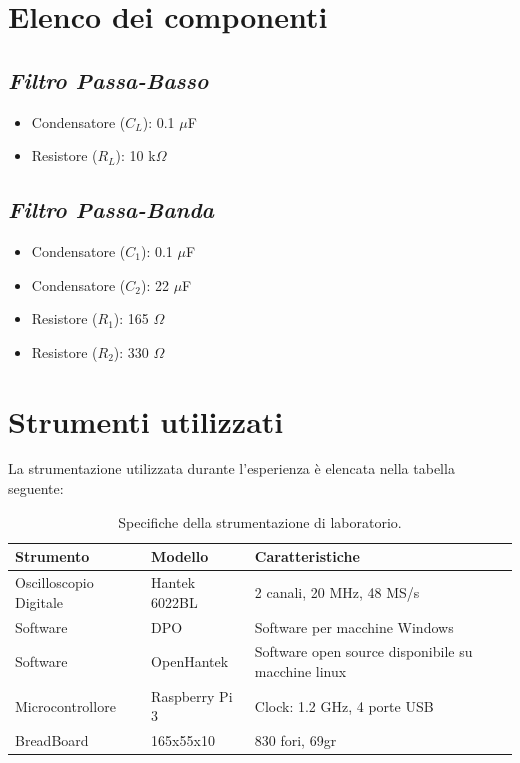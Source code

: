 \documentclass{article}
\begin{document}
\section{Elenco dei componenti}
  \subsection{\textit{Filtro Passa-Basso}}
    \begin{itemize}
        \item Condensatore ($C_{L}$): 0.1 $\mu$F
        \item Resistore ($R_{L}$): 10 k$\Omega$
    \end{itemize}

    \subsection{\textit{Filtro Passa-Banda}}
    \begin{itemize}
        \item Condensatore ($C_{1}$): 0.1 $\mu$F
        \item Condensatore ($C_{2}$): 22 $\mu$F
        \item Resistore ($R_{1}$): 165 $\Omega$
        \item Resistore ($R_{2}$): 330 $\Omega$
    \end{itemize}

\section{Strumenti utilizzati}

La strumentazione utilizzata durante l'esperienza è elencata nella tabella seguente:

  \begin{table}[H]
    \centering

    \begin{tabularx}{\textwidth}{|X|X|X|}
      \hline
      \textbf{Strumento} & \textbf{Modello} & \textbf{Caratteristiche} \\ \hline
      Oscilloscopio Digitale & Hantek 6022BL & 2 canali, 20 MHz, 48 MS/s \\ \hline
      Software & DPO & Software per macchine Windows \\ \hline
      Software & OpenHantek & Software open source disponibile su macchine linux \\ \hline
      Microcontrollore & Raspberry Pi 3 & Clock: 1.2 GHz, 4 porte USB \\ \hline
      BreadBoard & 165x55x10 & 830 fori, 69gr \\ \hline
    \end{tabularx}

    \captionsetup{justification=centering, singlelinecheck=false, font=small}
    \caption{Specifiche della strumentazione di laboratorio.}
  \end{table}
\end{document}
